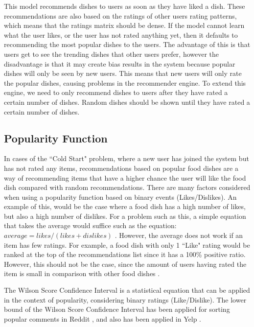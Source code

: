 This model recommends dishes to users as soon as they have liked a dish. These recommendations are also based on the ratings of other users rating patterns, which means that the ratings matrix should be dense. If the model cannot learn what the user likes, or the user has not rated anything yet, then it defaults to recommending the most popular dishes to the users. The advantage of this is that users get to see the trending dishes that other users prefer, however the disadvantage is that it may create bias results in the system because popular dishes will only be seen by new users. This means that new users will only rate the popular dishes, causing problems in the recommender engine. To extend this engine, we need to only recommend dishes to users after they have rated a certain number of dishes. Random dishes should be shown until they have rated a certain number of dishes. 


\subsection{Popularity Function} \label{subsection:popularity}

In cases of the ``Cold Start" problem, where a new user has joined the system but has not rated any items, recommendations based on popular food dishes are a way of recommending items that have a higher chance the user will like the food dish compared with random recommendations. There are many factors considered when using a popularity function based on binary events (Likes/Dislikes). An example of this, would be the case where a food dish has a high number of likes, but also a high number of dislikes. For a problem such as this, a simple equation that takes the average would suffice such as the equation: $average= likes/(likes+dislikes)$ \cite{popularity}. However, the average does not work if an item has few ratings. For example, a food dish with only 1 ``Like" rating would be ranked at the top of the recommendations list since it has a 100\% positive ratio. However, this should not be the case, since the amount of users having rated the item is small in comparison with other food dishes \cite{popularity}. 

The Wilson Score Confidence Interval \cite{wilson1927probable, popularity} is a statistical equation that can be applied in the context of popularity, considering binary ratings (Like/Dislike). The lower bound of the Wilson Score Confidence Interval has been applied for sorting popular comments in Reddit \cite{reddit}, and also has been applied in Yelp \cite{yelp_pop}.

